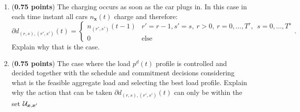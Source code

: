 \documentclass[11pt]{exam}
\begin{document}
\begin{questions}
\begin{enumerate}
\item (\textbf{0.75 points}) The charging occurs as soon as the car plugs in. In this case in each time instant all cars $n_{\bm x}(t)$ charge and therefore: 
\[ \partial d_{(r,s),(r',s')}(t)
=\begin{cases}
n_{(r',s')}(t-1) & r'=r-1,s'=s,~r>0,~r=0,\ldots,T^r,~~s=0, \ldots, T^s\\
0 & \mbox{else}
\end{cases}.
\]
Explain why that is the case. 
    \item (\textbf{0.75 points}) The case where the load $p^d(t)$ profile is controlled and decided together with the schedule and commitment decisions considering what is the feasible aggregate load and selecting the best load profile. Explain why the action that can be taken $ \partial d_{(r,s),(r',s')}(t)$ can only be within the set ${\cal U}_{\bm x,\bm x'}$
\end{enumerate}

\end{questions}
\end{document}
